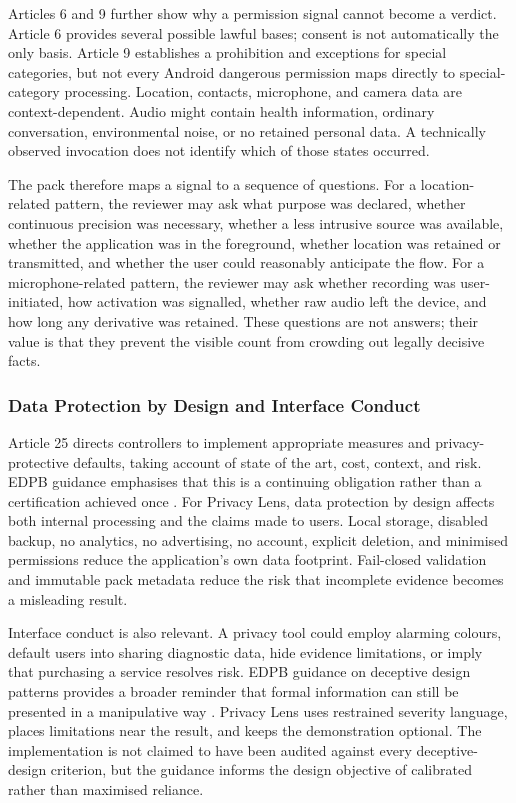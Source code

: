 Articles 6 and 9 further show why a permission signal cannot become a verdict. Article 6 provides several possible lawful bases; consent is not automatically the only basis. Article 9 establishes a prohibition and exceptions for special categories, but not every Android dangerous permission maps directly to special-category processing. Location, contacts, microphone, and camera data are context-dependent. Audio might contain health information, ordinary conversation, environmental noise, or no retained personal data. A technically observed invocation does not identify which of those states occurred.

The pack therefore maps a signal to a sequence of questions. For a location-related pattern, the reviewer may ask what purpose was declared, whether continuous precision was necessary, whether a less intrusive source was available, whether the application was in the foreground, whether location was retained or transmitted, and whether the user could reasonably anticipate the flow. For a microphone-related pattern, the reviewer may ask whether recording was user-initiated, how activation was signalled, whether raw audio left the device, and how long any derivative was retained. These questions are not answers; their value is that they prevent the visible count from crowding out legally decisive facts.

\subsubsection{Data Protection by Design and Interface Conduct}

Article 25 directs controllers to implement appropriate measures and privacy-protective defaults, taking account of state of the art, cost, context, and risk. EDPB guidance emphasises that this is a continuing obligation rather than a certification achieved once \cite{edpb2019}. For Privacy Lens, data protection by design affects both internal processing and the claims made to users. Local storage, disabled backup, no analytics, no advertising, no account, explicit deletion, and minimised permissions reduce the application's own data footprint. Fail-closed validation and immutable pack metadata reduce the risk that incomplete evidence becomes a misleading result.

Interface conduct is also relevant. A privacy tool could employ alarming colours, default users into sharing diagnostic data, hide evidence limitations, or imply that purchasing a service resolves risk. EDPB guidance on deceptive design patterns provides a broader reminder that formal information can still be presented in a manipulative way \cite{edpb2022}. Privacy Lens uses restrained severity language, places limitations near the result, and keeps the demonstration optional. The implementation is not claimed to have been audited against every deceptive-design criterion, but the guidance informs the design objective of calibrated rather than maximised reliance.

